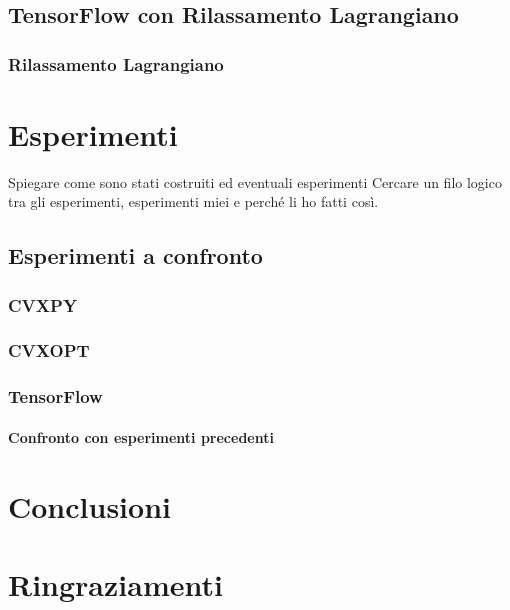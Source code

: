 \documentclass[a4paper,12pt]{report}
\begin{document}
\section{TensorFlow con Rilassamento Lagrangiano}
\subsection{Rilassamento Lagrangiano}

%

\chapter{Esperimenti}
\label{Captiolo 3}

Spiegare come sono stati costruiti ed eventuali esperimenti
Cercare un filo logico tra gli esperimenti, esperimenti miei e perché li ho fatti così.
\section{Esperimenti a confronto}
\subsection{CVXPY}
\subsection{CVXOPT}
\subsection{TensorFlow}
\subsubsection{Confronto con esperimenti precedenti}

\chapter{Conclusioni}
\label{Conclusioni}

\chapter*{Ringraziamenti}
\label{Ringraziamenti}

%
%



\end{document}
